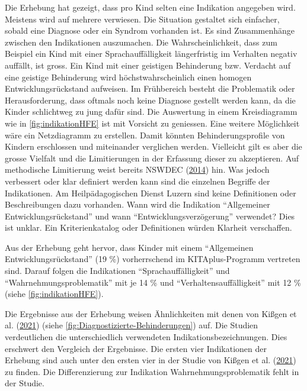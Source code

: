 \documentclass[
  ngerman,
  11pt,
  paper=a4,
  twoside,
  titlepage=true,
  openright,
  abstract=on,
  toc=listofnumbered,
  numbers=noenddot,
  chapterprefix=true,
  headings=optiontohead,
  svgnames,
  dvipsnames]{scrreprt}
\begin{document}
Die Erhebung hat gezeigt, dass pro Kind selten eine Indikation angegeben
wird. Meistens wird auf mehrere verwiesen. Die Situation gestaltet sich
einfacher, sobald eine Diagnose oder ein Syndrom vorhanden ist. Es sind
Zusammenhänge zwischen den Indikationen auszumachen. Die
Wahrscheinlichkeit, dass zum Beispiel ein Kind mit einer
Sprachauffälligkeit längerfristig im Verhalten negativ auffällt, ist
gross. Ein Kind mit einer geistigen Behinderung bzw. Verdacht auf eine
geistige Behinderung wird höchstwahrscheinlich einen homogen
Entwicklungsrückstand aufweisen. Im Frühbereich besteht die Problematik
oder Herausforderung, dass oftmals noch keine Diagnose gestellt werden
kann, da die Kinder schlichtweg zu jung dafür sind. Die Auswertung in
einem Kreisdiagramm wie in \cref{fig:indikationHFE} ist mit Vorsicht zu
geniessen. Eine weitere Möglichkeit wäre ein Netzdiagramm zu erstellen.
Damit könnten Behinderungsprofile von Kindern erschlossen und
miteinander verglichen werden. Vielleicht gilt es aber die grosse
Vielfalt und die Limitierungen in der Erfassung dieser zu akzeptieren.
Auf methodische Limitierung weist bereits NSWDEC
(\protect\hyperlink{ref-centreforeducation2014}{2014}) hin. Was jedoch
verbessert oder klar definiert werden kann sind die einzelnen Begriffe
der Indikationen. Am Heilpädagogischen Dienst Luzern sind keine
Definitionen oder Beschreibungen dazu vorhanden. Wann wird die
Indikation “Allgemeiner Entwicklungsrückstand” und wann
“Entwicklungsverzögerung” verwendet? Dies ist unklar. Ein
Kriterienkatalog oder Definitionen würden Klarheit verschaffen.

Aus der Erhebung geht hervor, dass Kinder mit einem “Allgemeinen
Entwicklungsrückstand” (19 \%) vorherrschend im KITAplus-Programm
vertreten sind. Darauf folgen die Indikationen “Sprachauffälligkeit” und
“Wahrnehmungsproblematik” mit je 14 \% und “Verhaltensauffälligkeit” mit
12 \% (siehe \cref{fig:indikationHFE}).

Die Ergebnisse aus der Erhebung weisen Ähnlichkeiten mit denen von
Kißgen et al.
(\protect\hyperlink{ref-studienvergleichbayernrheinland}{2021}) (siehe
\cref{fig:Diagnostizierte-Behinderungen}) auf. Die Studien verdeutlichen
die unterschiedlich verwendeten Indikationsbezeichnungen. Dies erschwert
den Vergleich der Ergebnisse. Die ersten vier Indikationen der Erhebung
sind auch unter den ersten vier in der Studie von Kißgen et al.
(\protect\hyperlink{ref-studienvergleichbayernrheinland}{2021}) zu
finden. Die Differenzierung zur Indikation Wahrnehmungsproblematik fehlt
in der Studie.
\end{document}

